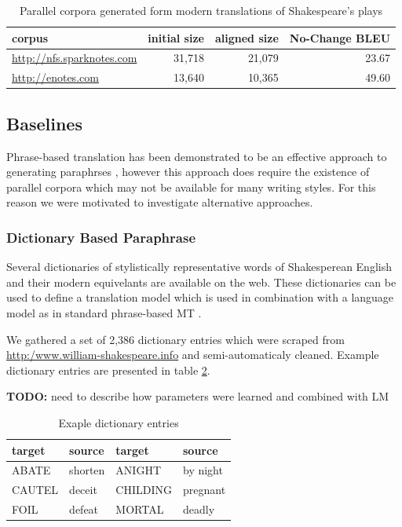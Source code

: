 \documentclass[10pt,a5paper,twoside]{article}
\begin{document}
\begin{table}
  \begin{center}
    \begin{tabular}{|l|r|r|r|}
      \hline
      corpus & initial size & aligned size & No-Change BLEU\\
      \hline
      \hline
      \url{http://nfs.sparknotes.com} & 31,718 & 21,079 & 23.67 \\
      \hline
      \url{http://enotes.com} & 13,640 & 10,365 & 49.60 \\
      \hline
    \end{tabular}
  \end{center}
  \caption{Parallel corpora generated form modern translations of Shakespeare's plays}
  \label{corpus_stats}
\end{table}

\subsection{Baselines}
Phrase-based translation has been demonstrated to be an effective approach to generating paraphrses \cite{chen11,quirk04}, however this approach does require the existence of
parallel corpora which may not be available for many writing styles.  For this reason we were motivated to investigate alternative approaches.

\subsubsection{Dictionary Based Paraphrase}
Several dictionaries of stylistically representative words of Shakesperean English and their modern equivelants are available on the web.  These dictionaries can be used 
to define a translation model which is used in combination with a language model as in standard phrase-based MT \cite{Koehn00}.

We gathered a set of 2,386  dictionary entries which were scraped from \url{http:/www.william-shakespeare.info} and semi-automaticaly cleaned.  Example
dictionary entries are presented in table \ref{dictionary_example}.

{\bf TODO:} need to describe how parameters were learned and combined with LM

\begin{table}
  \begin{center}
  \begin{tabular}{|l|l||l|l|}
    \hline
    target & source & target & source \\
    \hline
    \hline
    ABATE & shorten & ANIGHT & by night \\
    \hline
    CAUTEL & deceit & CHILDING & pregnant \\
    \hline
    FOIL & defeat & MORTAL & deadly \\
    \hline
  \end{tabular}
  \end{center}
  \caption{Exaple dictionary entries}
  \label{dictionary_example}
\end{table}
\end{document}
